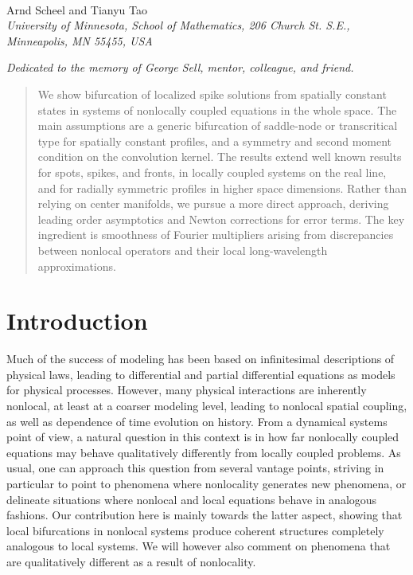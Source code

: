 \documentclass[10pt]{article}
\begin{document}
\begin{center}

{\fontsize{17}{17}\selectfont{Bifurcation to coherent structures in nonlocally coupled systems}}\\[0.2in]
Arnd Scheel and Tianyu Tao\\
\textit{\footnotesize 
University of Minnesota, School of Mathematics,   206 Church St. S.E., Minneapolis, MN 55455, USA}
\date{\small \today} 
\vspace*{0.2in}

\textit{Dedicated to the memory of George Sell, mentor, colleague, and friend.}\end{center}

\vspace*{0.2in}


\begin{abstract}
\noindent 
We show bifurcation of localized spike solutions from spatially constant states in systems of nonlocally coupled equations in the whole space. The main assumptions are a generic bifurcation of saddle-node or transcritical type for spatially constant profiles, and a symmetry and second moment condition on the convolution kernel. The results extend well known results for spots, spikes, and fronts, in locally coupled systems on the real line, and for radially symmetric profiles in higher space dimensions. Rather than relying on center manifolds, we pursue a more direct approach, deriving leading order asymptotics and Newton corrections for error terms. The key ingredient is smoothness of Fourier multipliers arising from discrepancies between nonlocal operators and their local long-wavelength approximations. 
\end{abstract}


\section{Introduction}\label{s:1}
Much of the success of modeling has been based on infinitesimal descriptions of physical laws, leading to differential and partial differential equations as models for physical processes. However, many physical interactions are inherently nonlocal, at least at a coarser modeling level, leading to nonlocal spatial coupling, as well as dependence of time evolution on history. From a dynamical systems point of view, a natural question in this context is in how far nonlocally coupled equations may behave qualitatively differently from locally coupled problems. As usual, one can approach this question from several vantage points, striving in particular to point to phenomena where nonlocality generates new phenomena, or delineate situations where nonlocal and local equations behave in analogous fashions. Our contribution here is mainly towards the latter aspect, showing that local bifurcations in nonlocal systems produce coherent structures completely analogous to local systems. We will however also comment on phenomena that are qualitatively different as a result of nonlocality. 
\end{document}
